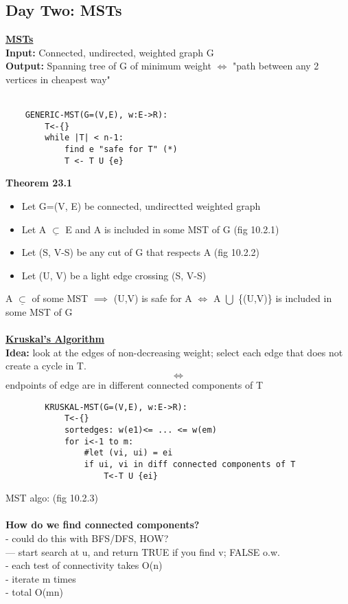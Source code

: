 \documentclass{article}
\begin{document}
	\subsection{Day Two: MSTs}
	\underline{\textbf{MSTs\\}}
	\textbf{Input:} Connected, undirected, weighted graph G\\
	\textbf{Output:} Spanning tree of G of minimum weight $\Leftrightarrow$ "path between any 2 vertices in cheapest way"\\\\
	\begin{lstlisting}
	GENERIC-MST(G=(V,E), w:E->R):
		T<-{}
		while |T| < n-1:
			find e "safe for T" (*)
			T <- T U {e}
	\end{lstlisting}
	\textbf{Theorem 23.1}
	\begin{itemize}
		\item Let G=(V, E) be connected, undirectted weighted graph
		\item Let A $\underline{\subset}$ E and A is included in some MST of G
		(fig 10.2.1)
		\item Let (S, V-S) be any cut of G that respects A (fig 10.2.2)
		\item Let (U, V) be a light edge crossing (S, V-S)
	\end{itemize}
	A $\underline{\subset}$ of some MST $\implies$ (U,V) is safe for A $\Leftrightarrow$ A $\bigcup$ \{(U,V)\} is included in some MST of G  \\\\
	\underline{\textbf{Kruskal's Algorithm}}\\
	\textbf{Idea:} look at the edges of non-decreasing weight; select each edge that does not create a cycle in T.
	$$\Leftrightarrow$$
	endpoints of edge are in different connected components of T
	\begin{lstlisting}
		KRUSKAL-MST(G=(V,E), w:E->R):
			T<-{}
			sortedges: w(e1)<= ... <= w(em)
			for i<-1 to m:
				#let (vi, ui) = ei
				if ui, vi in diff connected components of T
					T<-T U {ei}
	\end{lstlisting}
	MST algo: (fig 10.2.3)\\\\
	\textbf{How do we find connected components?\\}
	- could do this with BFS/DFS, HOW?\\
	--- start search at u, and return TRUE if you find v; FALSE o.w.\\
	- each test of connectivity takes O(n)\\
	- iterate m times\\
	- total O(mn)\\\\
	
\end{document}

